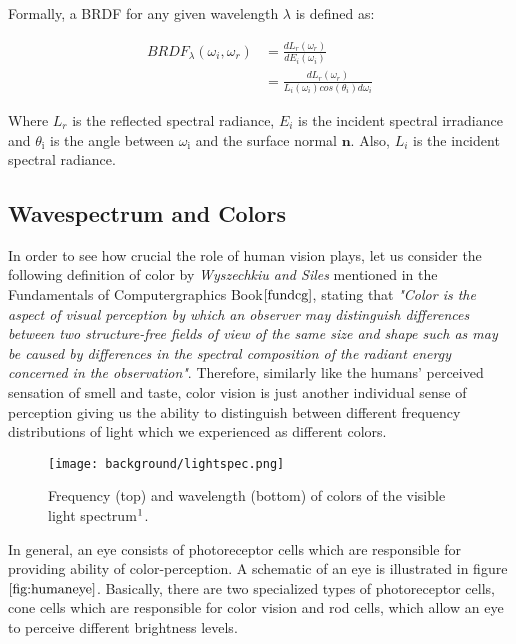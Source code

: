 Formally, a BRDF for any given wavelength $\lambda$ is defined as:

\begin{align}
  BRDF_{\lambda}(\omega_i, \omega_r)
  & = \frac{dL_r(\omega_r)}{dE_i(\omega_i)} \nonumber \\
  & = \frac{dL_r(\omega_r)}{L_i(\omega_i)cos(\theta_i)d\omega_i}
  \label{eq:defbrdf}
\end{align}

Where $L_{r}$ is the reflected spectral radiance, $E_i$ is the incident spectral irradiance and $\theta_{\text{i}}$ is the angle between $\omega_{\text{i}}$ and the surface normal $\mathbf n$. Also, $L_i$ is the incident spectral radiance.

\subsection{Wavespectrum and Colors}
In order to see how crucial the role of human vision plays, let us consider the following definition of color by \textit{Wyszechkiu and Siles} mentioned in the Fundamentals of Computergraphics Book$\cite{fundcg}$, stating that \textit{"Color is the aspect of visual perception by which an observer may distinguish differences between two structure-free fields of view of the same size and shape such as may be caused by differences in the spectral composition of the radiant energy concerned in the observation"}. Therefore, similarly like the humans' perceived sensation of smell and taste, color vision is just another individual sense of perception giving us the ability to distinguish between different frequency distributions of light which we experienced as different colors.

\begin{figure}[H]
  \centering
  \texttt{[image: background/lightspec.png]}
  \caption[Visible Lightspectrum]{Frequency (top) and wavelength (bottom) of colors of the visible light spectrum$\footnotemark$.}
  \label{fig:colorspectrum}
\end{figure}

In general, an eye consists of photoreceptor cells which are responsible for providing ability of color-perception. A schematic of an eye is illustrated in figure $\ref{fig:humaneye}$. Basically, there are two specialized types of photoreceptor cells, cone cells which are responsible for color vision and rod cells, which allow an eye to perceive different brightness levels.

